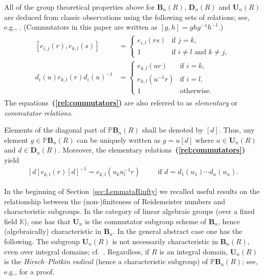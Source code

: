 \documentclass[a4paper,11pt]{amsart}
\numberwithin{equation}{section}
\theoremstyle{plain}
\theoremstyle{definition}
\newenvironment{rmk}
  {\pushQED{\qed}\renewcommand{\qedsymbol}{$\triangle$}\rmkx}
  {\popQED\endrmkx}
\newcommand{\K}{\mathbb{K}}
\newcommand{\eij}{e_{i,j}} %
\newcommand{\di}{d_i} %
\newcommand{\ekl}[1]{e_{#1}} %
\newcommand{\mbU}{\mathbf{U}} %
\newcommand{\mbD}{\mathbf{D}} %
\newcommand{\mbB}{\mathbf{B}} %
\newcommand{\PB}{\mathbb{P}\mathbf{B}} %
\newcommand{\bref}[1]{{\bf(\ref{#1})}} %
\begin{document}
All of the group theoretical properties above for $\mbB_n(R)$, $\mbD_n(R)$ and $\mbU_n(R)$ are deduced from classic observations using the following sets of relations; see, e.g., \cite{HahnO'Meara, Silvester}. 
(Commutators in this paper are written as $[g,h] = ghg^{-1}h^{-1}$.) 
\begin{align}
\label{rel:commutators}
\begin{split}
[\eij(r),\ekl{k,l}(s)] & =
\begin{cases}
\ekl{i,l}(rs) & \mbox{if } j=k,\\
1 & \mbox{if } i \neq l \text{ and } k \neq j,
\end{cases} \\
\di(u) \ekl{k,l}(r) \di(u)^{-1} & = 
\begin{cases}
\ekl{k,l}(ur) & \mbox{if } i=k,\\
\ekl{k,l}(u^{-1}r) & \mbox{if } i=l, \\
1 & \mbox{otherwise}.
\end{cases}
\end{split}
\end{align}
The equations~\bref{rel:commutators} are also referred to as \emph{elementary} or \emph{commutator relations}.

Elements of the diagonal part of $\PB_n(R)$ 
shall be denoted by $[d]$. 
Thus, any element $g \in \PB_n(R)$ 
can be uniquely written as $g = u[d]$ where $u \in \mbU_n(R)$ and $d \in \mbD_n(R)$. 
Moreover, the elementary relations~\bref{rel:commutators} yield 
\begin{align} \label{rel:projectiveconjugation}
[d] \ekl{k,l}(r) [d]^{-1} = \ekl{k,l}(u_k u_l^{-1} r) & \phantom{a} & \text{ if } d = d_1(u_1) \cdots d_n(u_n).
\end{align}

In the beginning of Section~\ref{sec:LemmataRinfty} we recalled useful results on the relationship between the (non-)finiteness of Reidemeister numbers and characteristic subgroups. 
In the category of linear algebraic groups (over a fixed field $\K$), one has that $\mbU_n$ is the commutator subgroup scheme of $\mbB_n$, hence (algebraically) characteristic in $\mbB_n$. In the general abstract case one has the following.
\begin{rmk} \label{rmk:Uncharacteristic}
The subgroup $\mbU_n(R)$ is not necessarily characteristic in $\mbB_n(R)$, even over integral domains; cf.~\cite[Section~3]{Bn1}. Regardless, if $R$ is an integral domain, $\mbU_n(R)$ is the \emph{Hirsch--Plotkin radical} (hence a characteristic subgroup) of $\PB_n(R)$; see, e.g., \cite[Section~3]{Bn1} for a proof.
\end{rmk} 
\end{document}
